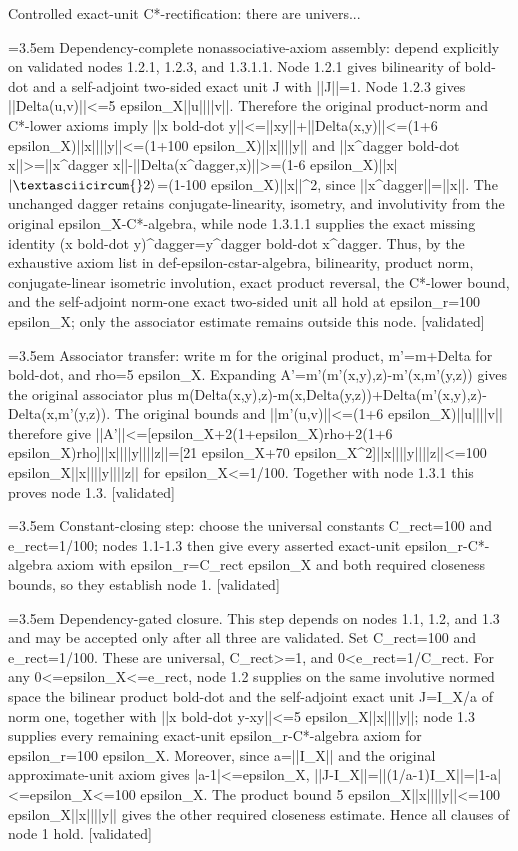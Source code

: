 \documentclass{article}
\newcommand{\step}[1]{\par\noindent\hangindent=3.5em\hangafter=1%
  \makebox[3.5em][l]{\textbf{#1.}}}
\newcommand{\steptag}[1]{\hfill{\small\textsf{[#1]}}}
\begin{document}
\begin{proofbox}{Controlled exact-unit C*-rectification: there are univers...}
\step{1.3.1.2.1} Dependency-complete nonassociative-axiom assembly: depend explicitly on validated nodes 1.2.1, 1.2.3, and 1.3.1.1. Node 1.2.1 gives bilinearity of bold-dot and a self-adjoint two-sided exact unit J with ||J||=1. Node 1.2.3 gives ||Delta(u,v)||<=5 epsilon\_X||u||||v||. Therefore the original product-norm and C*-lower axioms imply ||x bold-dot y||<=||xy||+||Delta(x,y)||<=(1+6 epsilon\_X)||x||||y||<=(1+100 epsilon\_X)||x||||y|| and ||x\textasciicircum{}dagger bold-dot x||>=||x\textasciicircum{}dagger x||-||Delta(x\textasciicircum{}dagger,x)||>=(1-6 epsilon\_X)||x|$|\textasciicircum{}2\rangle$=(1-100 epsilon\_X)||x||\textasciicircum{}2, since ||x\textasciicircum{}dagger||=||x||. The unchanged dagger retains conjugate-linearity, isometry, and involutivity from the original epsilon\_X-C*-algebra, while node 1.3.1.1 supplies the exact missing identity (x bold-dot y)\textasciicircum{}dagger=y\textasciicircum{}dagger bold-dot x\textasciicircum{}dagger. Thus, by the exhaustive axiom list in def-epsilon-cstar-algebra, bilinearity, product norm, conjugate-linear isometric involution, exact product reversal, the C*-lower bound, and the self-adjoint norm-one exact two-sided unit all hold at epsilon\_r=100 epsilon\_X; only the associator estimate remains outside this node. \steptag{validated} \\[4pt]
\step{1.3.2} Associator transfer: write m for the original product, m'=m+Delta for bold-dot, and rho=5 epsilon\_X. Expanding A'=m'(m'(x,y),z)-m'(x,m'(y,z)) gives the original associator plus m(Delta(x,y),z)-m(x,Delta(y,z))+Delta(m'(x,y),z)-Delta(x,m'(y,z)). The original bounds and ||m'(u,v)||<=(1+6 epsilon\_X)||u||||v|| therefore give ||A'||<=[epsilon\_X+2(1+epsilon\_X)rho+2(1+6 epsilon\_X)rho]||x||||y||||z||=[21 epsilon\_X+70 epsilon\_X\textasciicircum{}2]||x||||y||||z||<=100 epsilon\_X||x||||y||||z|| for epsilon\_X<=1/100. Together with node 1.3.1 this proves node 1.3. \steptag{validated} \\[4pt]
\step{1.4} Constant-closing step: choose the universal constants C\_rect=100 and e\_rect=1/100; nodes 1.1-1.3 then give every asserted exact-unit epsilon\_r-C*-algebra axiom with epsilon\_r=C\_rect epsilon\_X and both required closeness bounds, so they establish node 1. \steptag{validated} \\[6pt]
\step{1.4.1} Dependency-gated closure. This step depends on nodes 1.1, 1.2, and 1.3 and may be accepted only after all three are validated. Set C\_rect=100 and e\_rect=1/100. These are universal, C\_rect>=1, and 0<e\_rect=1/C\_rect. For any 0<=epsilon\_X<=e\_rect, node 1.2 supplies on the same involutive normed space the bilinear product bold-dot and the self-adjoint exact unit J=I\_X/a of norm one, together with ||x bold-dot y-xy||<=5 epsilon\_X||x||||y||; node 1.3 supplies every remaining exact-unit epsilon\_r-C*-algebra axiom for epsilon\_r=100 epsilon\_X. Moreover, since a=||I\_X|| and the original approximate-unit axiom gives |a-1|<=epsilon\_X, ||J-I\_X||=||(1/a-1)I\_X||=|1-a|<=epsilon\_X<=100 epsilon\_X. The product bound 5 epsilon\_X||x||||y||<=100 epsilon\_X||x||||y|| gives the other required closeness estimate. Hence all clauses of node 1 hold. \steptag{validated} \\[4pt]
\end{proofbox}
\end{document}
